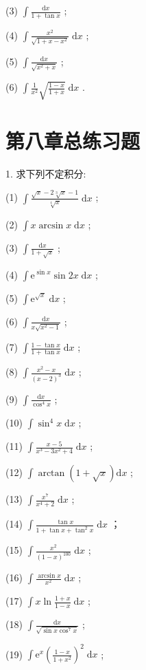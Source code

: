 (3) \(\int \frac{\mathrm{d}x}{1 + \tan x}\) ;

(4) \(\int \frac{{x}^{2}}{\sqrt{1 + x - {x}^{2}}}\mathrm{\;d}x\) ;

(5) \(\int \frac{\mathrm{d}x}{\sqrt{{x}^{2} + x}}\) ;

(6) \(\int \frac{1}{{x}^{2}}\sqrt{\frac{1 - x}{1 + x}}\mathrm{\;d}x\) .

\section{第八章总练习题}

1. 求下列不定积分:

(1) \(\int \frac{\sqrt{x} - 2\sqrt[3]{x} - 1}{\sqrt[4]{x}}\mathrm{\;d}x\) ;

(2) \(\int x\arcsin x\mathrm{\;d}x\) ;

(3) \(\int \frac{\mathrm{d}x}{1 + \sqrt{x}}\) ;

(4) \(\int {\mathrm{e}}^{\sin x}\sin {2x}\mathrm{\;d}x\) ;

(5) \(\int {\mathrm{e}}^{\sqrt{x}}\mathrm{\;d}x\) ;

(6) \(\int \frac{\mathrm{d}x}{x\sqrt{{x}^{2} - 1}}\) ;

(7) \(\int \frac{1 - \tan x}{1 + \tan x}\mathrm{\;d}x\) ;

(8) \(\int \frac{{x}^{2} - x}{{\left( x - 2\right) }^{3}}\mathrm{\;d}x\) ;

(9) \(\int \frac{\mathrm{d}x}{{\cos }^{4}x}\) ;

(10) \(\int {\sin }^{4}x\mathrm{\;d}x\) ;

(11) \(\int \frac{x - 5}{{x}^{3} - 3{x}^{2} + 4}\mathrm{\;d}x\) ;

(12) \(\int \arctan \left( {1 + \sqrt{x}}\right) \mathrm{d}x\) ;

(13) \(\int \frac{{x}^{7}}{{x}^{4} + 2}\mathrm{\;d}x\) ;

(14) \(\int \frac{\tan x}{1 + \tan x + {\tan }^{2}x}\mathrm{\;d}x\) ；

(15) \(\int \frac{{x}^{2}}{{\left( 1 - x\right) }^{100}}\mathrm{\;d}x\) ;

(16) \(\int \frac{\arcsin x}{{x}^{2}}\mathrm{\;d}x\) ;

(17) \(\int x\ln \frac{1 + x}{1 - x}\mathrm{\;d}x\) ;

(18) \(\int \frac{\mathrm{d}x}{\sqrt{\sin x{\cos }^{7}x}}\) ;

(19) \(\int {\mathrm{e}}^{x}{\left( \frac{1 - x}{1 + {x}^{2}}\right) }^{2}\mathrm{\;d}x\) ;

